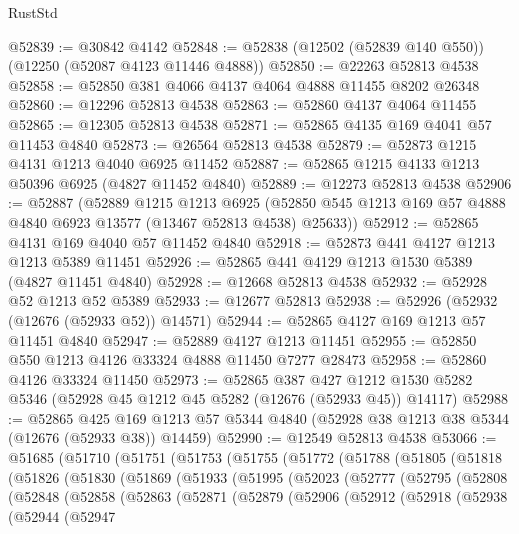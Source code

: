\begin{lexlean}{RustStd}
\begin{coremodule}
@52839 := @30842 @4142
@52848 := @52838 (@12502 (@52839 @140 @550)) (@12250 (@52087 @4123 @11446 @4888))
@52850 := @22263 @52813 @4538
@52858 := @52850 @381 @4066 @4137 @4064 @4888 @11455 @8202 @26348
@52860 := @12296 @52813 @4538
@52863 := @52860 @4137 @4064 @11455
@52865 := @12305 @52813 @4538
@52871 := @52865 @4135 @169 @4041 @57 @11453 @4840
@52873 := @26564 @52813 @4538
@52879 := @52873 @1215 @4131 @1213 @4040 @6925 @11452
@52887 := @52865 @1215 @4133 @1213 @50396 @6925 (@4827 @11452 @4840)
@52889 := @12273 @52813 @4538
@52906 := @52887
    (@52889
      @1215
      @1213
      @6925
      (@52850 @545 @1213 @169 @57 @4888 @4840 @6923 @13577 (@13467 @52813 @4538) @25633))
@52912 := @52865 @4131 @169 @4040 @57 @11452 @4840
@52918 := @52873 @441 @4127 @1213 @1213 @5389 @11451
@52926 := @52865 @441 @4129 @1213 @1530 @5389 (@4827 @11451 @4840)
@52928 := @12668 @52813 @4538
@52932 := @52928 @52 @1213 @52 @5389
@52933 := @12677 @52813
@52938 := @52926 (@52932 (@12676 (@52933 @52)) @14571)
@52944 := @52865 @4127 @169 @1213 @57 @11451 @4840
@52947 := @52889 @4127 @1213 @11451
@52955 := @52850 @550 @1213 @4126 @33324 @4888 @11450 @7277 @28473
@52958 := @52860 @4126 @33324 @11450
@52973 := @52865
    @387
    @427
    @1212
    @1530
    @5282
    @5346
    (@52928 @45 @1212 @45 @5282 (@12676 (@52933 @45)) @14117)
@52988 := @52865
    @425
    @169
    @1213
    @57
    @5344
    @4840
    (@52928 @38 @1213 @38 @5344 (@12676 (@52933 @38)) @14459)
@52990 := @12549 @52813 @4538
@53066 := @51685
    (@51710
      (@51751
        (@51753
          (@51755
            (@51772
              (@51788
                (@51805
                  (@51818
                    (@51826
                      (@51830
                        (@51869
                          (@51933
                            (@51995
                              (@52023
                                (@52777
                                  (@52795
                                    (@52808
                                      (@52848
                                        (@52858
                                          (@52863
                                            (@52871
                                              (@52879
                                                (@52906
                                                  (@52912
                                                    (@52918
                                                      (@52938
                                                        (@52944
                                                          (@52947

\end{coremodule}
\end{lexlean}
